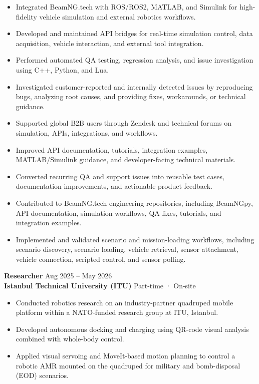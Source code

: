 \documentclass[11pt,a4paper]{article}
\begin{document}
\begin{itemize}
    \item Integrated BeamNG.tech with ROS/ROS2, MATLAB, and Simulink for high-fidelity vehicle simulation and external robotics workflows.
    \item Developed and maintained API bridges for real-time simulation control, data acquisition, vehicle interaction, and external tool integration.
    \item Performed automated QA testing, regression analysis, and issue investigation using C++, Python, and Lua.
    \item Investigated customer-reported and internally detected issues by reproducing bugs, analyzing root causes, and providing fixes, workarounds, or technical guidance.
    \item Supported global B2B users through Zendesk and technical forums on simulation, APIs, integrations, and workflows.
    \item Improved API documentation, tutorials, integration examples, MATLAB/Simulink guidance, and developer-facing technical materials.
    \item Converted recurring QA and support issues into reusable test cases, documentation improvements, and actionable product feedback.
    \item Contributed to BeamNG.tech engineering repositories, including BeamNGpy, API documentation, simulation workflows, QA fixes, tutorials, and integration examples.
    \item Implemented and validated scenario and mission-loading workflows, including scenario discovery, scenario loading, vehicle retrieval, sensor attachment, vehicle connection, scripted control, and sensor polling.
\end{itemize}

\textbf{Researcher} \hfill Aug 2025 -- May 2026\\
\textbf{Istanbul Technical University (ITU)} \hfill Part-time · On-site

\begin{itemize}
    \item Conducted robotics research on an industry-partner quadruped mobile platform within a NATO-funded research group at ITU, Istanbul.
    \item Developed autonomous docking and charging using QR-code visual analysis combined with whole-body control.
    \item Applied visual servoing and MoveIt-based motion planning to control a robotic AMR mounted on the quadruped for military and bomb-disposal (EOD) scenarios.
\end{itemize}
\end{document}
